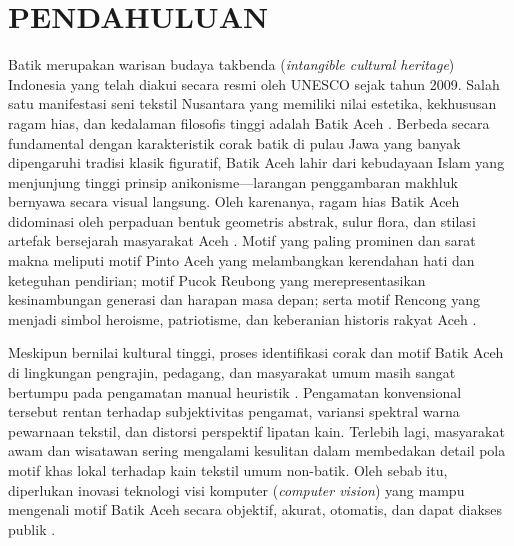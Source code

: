 \documentclass[10pt,a4paper]{article}
\begin{document}
\section{PENDAHULUAN}

Batik merupakan warisan budaya takbenda (\textit{intangible cultural heritage}) Indonesia yang telah diakui secara resmi oleh UNESCO sejak tahun 2009. Salah satu manifestasi seni tekstil Nusantara yang memiliki nilai estetika, kekhususan ragam hias, dan kedalaman filosofis tinggi adalah Batik Aceh \cite{fajira2022, zayyan2023}. Berbeda secara fundamental dengan karakteristik corak batik di pulau Jawa yang banyak dipengaruhi tradisi klasik figuratif, Batik Aceh lahir dari kebudayaan Islam yang menjunjung tinggi prinsip anikonisme---larangan penggambaran makhluk bernyawa secara visual langsung. Oleh karenanya, ragam hias Batik Aceh didominasi oleh perpaduan bentuk geometris abstrak, sulur flora, dan stilasi artefak bersejarah masyarakat Aceh \cite{zayyan2023, utaminingsih2024}. Motif yang paling prominen dan sarat makna meliputi motif Pinto Aceh yang melambangkan kerendahan hati dan keteguhan pendirian; motif Pucok Reubong yang merepresentasikan kesinambungan generasi dan harapan masa depan; serta motif Rencong yang menjadi simbol heroisme, patriotisme, dan keberanian historis rakyat Aceh \cite{fajira2022, afifah2025}.

Meskipun bernilai kultural tinggi, proses identifikasi corak dan motif Batik Aceh di lingkungan pengrajin, pedagang, dan masyarakat umum masih sangat bertumpu pada pengamatan manual heuristik \cite{fajira2022}. Pengamatan konvensional tersebut rentan terhadap subjektivitas pengamat, variansi spektral warna pewarnaan tekstil, dan distorsi perspektif lipatan kain. Terlebih lagi, masyarakat awam dan wisatawan sering mengalami kesulitan dalam membedakan detail pola motif khas lokal terhadap kain tekstil umum non-batik. Oleh sebab itu, diperlukan inovasi teknologi visi komputer (\textit{computer vision}) yang mampu mengenali motif Batik Aceh secara objektif, akurat, otomatis, dan dapat diakses publik \cite{dani2024, anastasya2024}.
\end{document}
